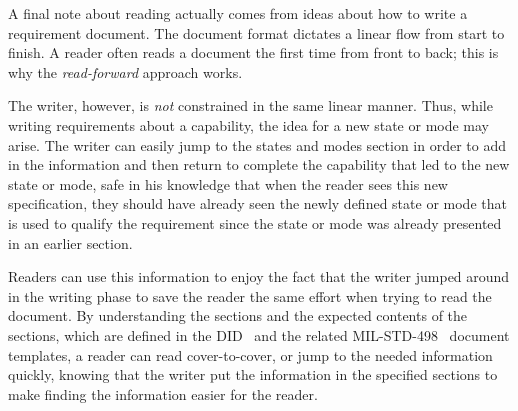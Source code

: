 A final note about reading actually comes from ideas about how to write a requirement document.
The document format dictates a linear flow from start to finish.
A reader often reads a document the first time from front to back; this is why the {\em read-forward} approach works.

The writer, however, is {\em not} constrained in the same linear manner.
Thus, while writing requirements about a capability, the idea for a new state or mode may arise.
The writer can easily jump to the states and modes section in order to add in the information and then return to complete the capability that led to the new state or mode, safe in his knowledge that when the reader sees this new specification, they should have already seen the newly defined state or mode that is used to qualify the requirement since the state or mode was already presented in an earlier section.

Readers can use this information to enjoy the fact that the writer jumped around in the writing phase to save the reader the same effort when trying to read the document.
By understanding the sections and the expected contents of the sections, which are defined in the \SSS DID~\cite{ref__SSS_DID} and the related MIL-STD-498~\cite{ref__MIL_STD_498} document templates, a reader can read cover-to-cover, or jump to the needed information quickly, knowing that the writer put the information in the specified sections to make finding the information easier for the reader.